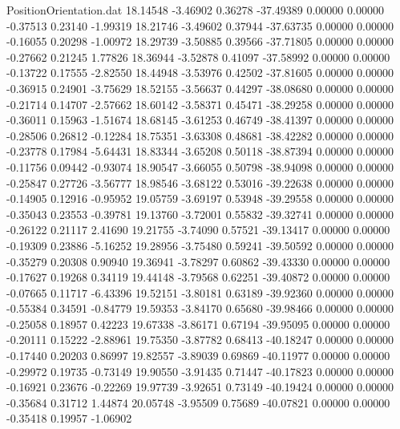 \begin{filecontents}{PositionOrientation.dat}
  18.14548   -3.46902    0.36278   -37.49389    0.00000    0.00000   -0.37513    0.23140   -1.99319
  18.21746   -3.49602    0.37944   -37.63735    0.00000    0.00000   -0.16055    0.20298   -1.00972
  18.29739   -3.50885    0.39566   -37.71805    0.00000    0.00000   -0.27662    0.21245    1.77826
  18.36944   -3.52878    0.41097   -37.58992    0.00000    0.00000   -0.13722    0.17555   -2.82550
  18.44948   -3.53976    0.42502   -37.81605    0.00000    0.00000   -0.36915    0.24901   -3.75629
  18.52155   -3.56637    0.44297   -38.08680    0.00000    0.00000   -0.21714    0.14707   -2.57662
  18.60142   -3.58371    0.45471   -38.29258    0.00000    0.00000   -0.36011    0.15963   -1.51674
  18.68145   -3.61253    0.46749   -38.41397    0.00000    0.00000   -0.28506    0.26812   -0.12284
  18.75351   -3.63308    0.48681   -38.42282    0.00000    0.00000   -0.23778    0.17984   -5.64431
  18.83344   -3.65208    0.50118   -38.87394    0.00000    0.00000   -0.11756    0.09442   -0.93074
  18.90547   -3.66055    0.50798   -38.94098    0.00000    0.00000   -0.25847    0.27726   -3.56777
  18.98546   -3.68122    0.53016   -39.22638    0.00000    0.00000   -0.14905    0.12916   -0.95952
  19.05759   -3.69197    0.53948   -39.29558    0.00000    0.00000   -0.35043    0.23553   -0.39781
  19.13760   -3.72001    0.55832   -39.32741    0.00000    0.00000   -0.26122    0.21117    2.41690
  19.21755   -3.74090    0.57521   -39.13417    0.00000    0.00000   -0.19309    0.23886   -5.16252
  19.28956   -3.75480    0.59241   -39.50592    0.00000    0.00000   -0.35279    0.20308    0.90940
  19.36941   -3.78297    0.60862   -39.43330    0.00000    0.00000   -0.17627    0.19268    0.34119
  19.44148   -3.79568    0.62251   -39.40872    0.00000    0.00000   -0.07665    0.11717   -6.43396
  19.52151   -3.80181    0.63189   -39.92360    0.00000    0.00000   -0.55384    0.34591   -0.84779
  19.59353   -3.84170    0.65680   -39.98466    0.00000    0.00000   -0.25058    0.18957    0.42223
  19.67338   -3.86171    0.67194   -39.95095    0.00000    0.00000   -0.20111    0.15222   -2.88961
  19.75350   -3.87782    0.68413   -40.18247    0.00000    0.00000   -0.17440    0.20203    0.86997
  19.82557   -3.89039    0.69869   -40.11977    0.00000    0.00000   -0.29972    0.19735   -0.73149
  19.90550   -3.91435    0.71447   -40.17823    0.00000    0.00000   -0.16921    0.23676   -0.22269
  19.97739   -3.92651    0.73149   -40.19424    0.00000    0.00000   -0.35684    0.31712    1.44874
  20.05748   -3.95509    0.75689   -40.07821    0.00000    0.00000   -0.35418    0.19957   -1.06902

\end{filecontents}
